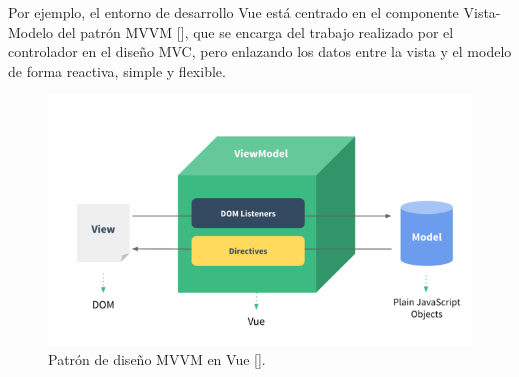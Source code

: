 Por ejemplo, el entorno de desarrollo Vue está centrado en el componente Vista-Modelo del patrón MVVM [\cite{49,47}], que se encarga del trabajo realizado por el controlador en el diseño MVC, pero enlazando los datos entre la vista y el modelo de forma reactiva, simple y flexible.

\begin{figure}[htbp]
\centering
\includegraphics[scale=0.8]{Graphics/vmmv}
\caption{Patrón de diseño MVVM en Vue [\cite{47}].}
\label{fig:vmmv}
\end{figure}


